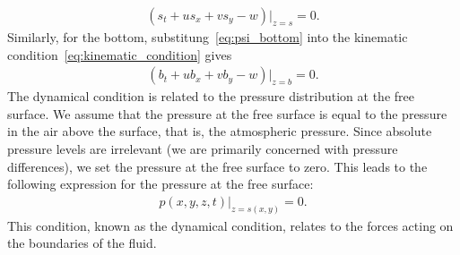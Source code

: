 \begin{align}\label{eq:kinematic_condition_free_surface}
    (s_t + u s_x + v s_y - w)|_{z=s} = 0.
\end{align}
Similarly, for the bottom, substitung~\eqref{eq:psi_bottom} into the kinematic condition~\eqref{eq:kinematic_condition} gives
\begin{align}\label{eq:kinematic_condition_bottom}
    (b_t + u b_x + v b_y - w)|_{z=b} = 0.
\end{align}
The dynamical condition is related to the pressure distribution at the free surface.
We assume that the pressure at the free surface is equal to the pressure in the air above the surface, that is, the atmospheric pressure.
Since absolute pressure levels are irrelevant (we are primarily concerned with pressure differences), we set the pressure at the free surface to zero.
This leads to the following expression for the pressure at the free surface:
\begin{align}\label{eq:pressure_free_surface}
    p(x,y,z,t)|_{z = s(x,y)} = 0.
\end{align}
This condition, known as the dynamical condition, relates to the forces acting on the boundaries of the fluid.

